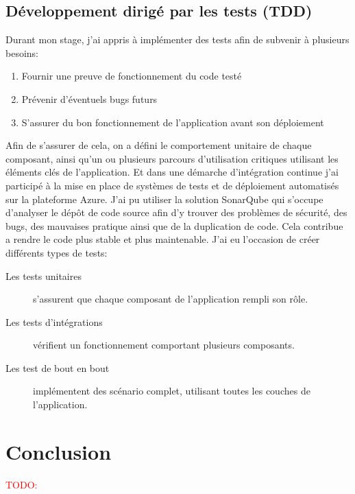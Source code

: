 \documentclass[12pt, a4paper]{report}
\makeatletter
\newcommand\TODO[1]{\textcolor{red}{TODO\@: #1}}
\makeatother
\begin{document}
        \section{Développement dirigé par les tests (TDD)}
            Durant mon stage, j'ai appris à implémenter des tests afin de subvenir à plusieurs besoins\@:
            \begin{enumerate}
                \item Fournir une preuve de fonctionnement du code testé
                \item Prévenir d'éventuels bugs futurs
                \item S'assurer du bon fonctionnement de l'application avant son déploiement
            \end{enumerate}
            Afin de s'assurer de cela, on a défini le comportement unitaire de chaque composant, ainsi qu'un ou plusieurs parcours d'utilisation critiques utilisant les éléments clés de l'application.\newline
            Et dans une démarche d'intégration continue j'ai participé à la mise en place de systèmes de tests et de déploiement automatisés sur la plateforme Azure.\newline
                J'ai pu utiliser la solution SonarQube qui s'occupe d'analyser le dépôt de code source afin d'y trouver des problèmes de sécurité, des bugs, des mauvaises pratique ainsi que de la duplication de code.\newline
                Cela contribue a rendre le code plus stable et plus maintenable.\newline
                J'ai eu l'occasion de créer différents types de tests\@:
                \begin{description}
                    \item [Les tests unitaires] s'assurent que chaque composant de l'application rempli son rôle.
                    \item [Les tests d'intégrations] vérifient un fonctionnement comportant plusieurs composants.
                    \item [Les test de bout en bout] implémentent des scénario complet, utilisant toutes les couches de l'application.
                \end{description}
    \chapter{Conclusion}
        \TODO{}
	\makeutbmbackcover{}
\end{document}
